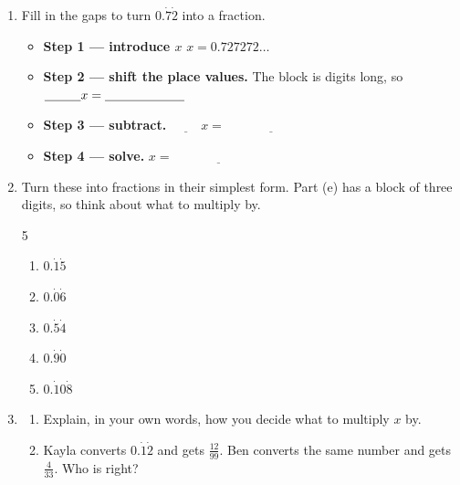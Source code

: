 \documentclass[12pt,a4paper]{article}
\newcommand{\ansline}[1][2.2cm]{\underline{\hspace{#1}}}
\begin{document}
\begin{enumerate}[resume]

\item Fill in the gaps to turn $0.\dot{7}\dot{2}$ into a fraction.
\begin{itemize}[label={},leftmargin=1.8em,itemsep=12pt,topsep=6pt]
  \item \textbf{Step 1 --- introduce $x$} \hfill $x=0.727272\ldots$
  \item \textbf{Step 2 --- shift the place values.} The block is
        \ansline[1cm] digits long, so $\ansline[1cm]x=\ansline[2.2cm]$
  \item \textbf{Step 3 --- subtract.} \hfill $\ansline[1cm]x=\ansline[3cm]$
  \item \textbf{Step 4 --- solve.} \hfill $x=\ansline[3cm]$
\end{itemize}

\item Turn these into fractions in their simplest form. Part (e) has a block
of three digits, so think about what to multiply by.
\begin{multicols}{5}
\begin{enumerate}
  \item $0.\dot{1}\dot{5}$
  \item $0.\dot{0}\dot{6}$
  \item $0.\dot{5}\dot{4}$
  \item $0.\dot{9}\dot{0}$
  \item $0.\dot{1}0\dot{8}$
\end{enumerate}
\end{multicols}
\vspace{13em}

\newpage

\item
\begin{enumerate}
  \item Explain, in your own words, how you decide what to multiply $x$ by.

        \vspace{4em}
  \item Kayla converts $0.\dot{1}\dot{2}$ and gets $\frac{12}{99}$. Ben
        converts the same number and gets $\frac{4}{33}$. Who is right?

        \vspace{5em}
\end{enumerate}

\end{enumerate}
\end{document}
